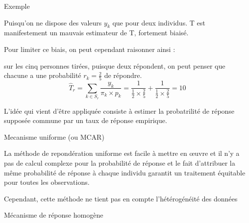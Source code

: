 \begin{frame}{Exemple}
	
	Puisqu'on ne dispose des valeurs $y_k$ que pour deux individus. T est manifestement un
	mauvais estimateur de T, fortement biaisé. \\ \vspace{0.3cm}
	
	Pour limiter ce biais, on peut cependant raisonner ainsi : \\ \vspace{0.3cm}
	
	sur les cinq personnes tirées, puisque deux répondent, on peut penser que chacune a une probabilité $r_k = \frac{2}{5} $ de répondre. \\ 
	
	$$\hat{T}_r =  \sum_{k \in S_r} \frac{y_k}{\pi_k \times p_k} =  \frac{1}{\frac{1}{2} \times \frac{2}{5}} + \frac{1}{\frac{1}{2}  \times \frac{2}{5}} = 10 $$
	
	
L'idée qui vient d'être	appliquée consiste à estimer la probatrilité de réponse supposée commune par un taux de réponse empirique. 
	
\end{frame}


\begin{frame}{Mecanisme uniforme (ou MCAR)}

La méthode de repondération uniforme est facile à mettre en œuvre et il n’y a pas de calcul complexe pour la probabilité de réponse et le fait
d’attribuer la même probabilité de réponse à chaque individu garantit un traitement équitable pour toutes les observations.\\ \vspace{0.5cm}

Cependant, cette
méthode ne tient pas en compte l’hétérogénéité des données


\end{frame}





\begin{frame}{}
	
	\huge \begin{center}
		Mécanisme de réponse homogène
	\end{center}
	
\end{frame}


